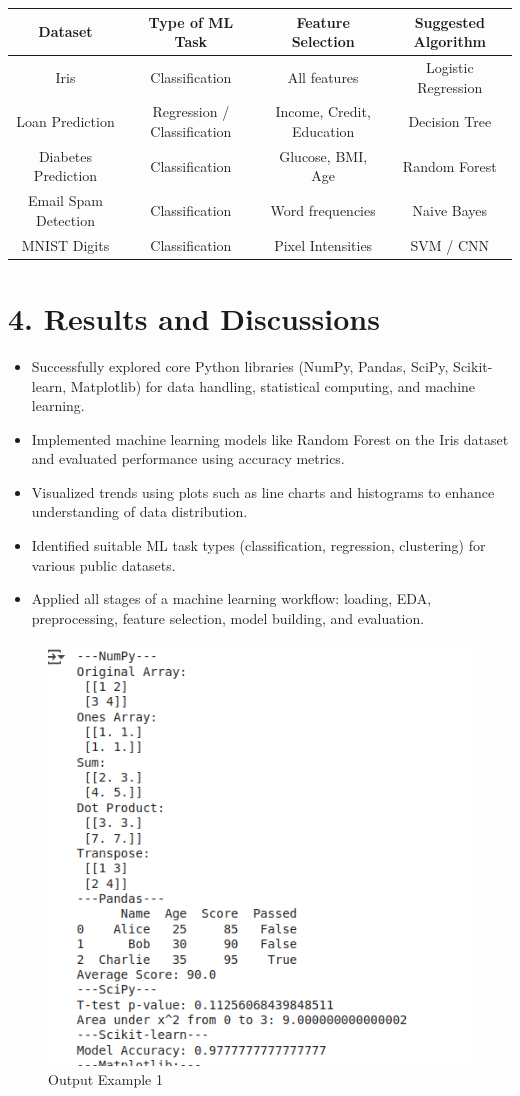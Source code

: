 \documentclass[11pt]{article}
\begin{document}
\begin{table}[h!]
\centering
\renewcommand{\arraystretch}{1.3}
\begin{tabular}{|c|c|c|c|}
\hline
\textbf{Dataset} & \textbf{Type of ML Task} & \textbf{Feature Selection} & \textbf{Suggested Algorithm} \\
\hline
Iris & Classification & All features & Logistic Regression \\
Loan Prediction & Regression / Classification & Income, Credit, Education & Decision Tree \\
Diabetes Prediction & Classification & Glucose, BMI, Age & Random Forest \\
Email Spam Detection & Classification & Word frequencies & Naive Bayes \\
MNIST Digits & Classification & Pixel Intensities & SVM / CNN \\
\hline
\end{tabular}
\end{table}
\section*{4. Results and Discussions}

\begin{itemize}
    \item Successfully explored core Python libraries (NumPy, Pandas, SciPy, Scikit-learn, Matplotlib) for data handling, statistical computing, and machine learning.
    \item Implemented machine learning models like Random Forest on the Iris dataset and evaluated performance using accuracy metrics.
    \item Visualized trends using plots such as line charts and histograms to enhance understanding of data distribution.
    \item Identified suitable ML task types (classification, regression, clustering) for various public datasets.
    \item Applied all stages of a machine learning workflow: loading, EDA, preprocessing, feature selection, model building, and evaluation.
\end{itemize}
\begin{figure}[h!]
    \centering
    \includegraphics[width=0.6\linewidth]{ml1.png}
    \caption{Output Example 1}
    \label{fig:output1}
\end{figure}
\end{document}
